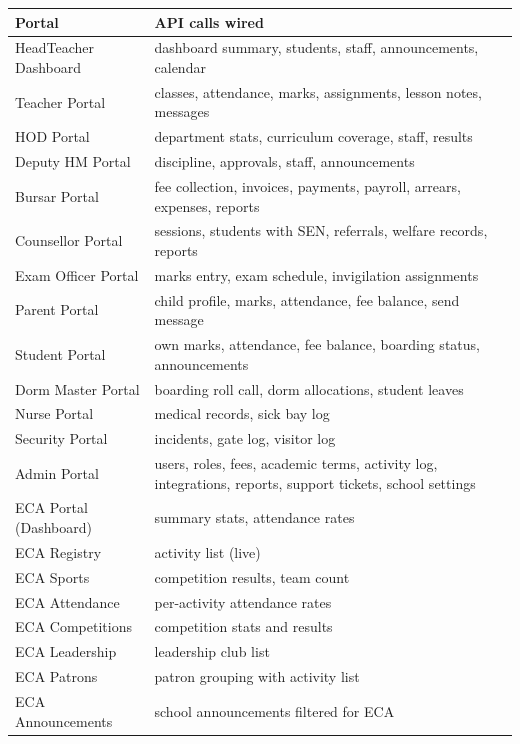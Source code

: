 \documentclass[11pt, a4paper]{article}
\begin{document}
\begin{longtable}{@{}p{5cm} p{9cm}@{}}
  \toprule
  Portal & API calls wired \\
  \midrule
  \endhead
  HeadTeacher Dashboard & dashboard summary, students, staff, announcements, calendar \\
  Teacher Portal & classes, attendance, marks, assignments, lesson notes, messages \\
  HOD Portal & department stats, curriculum coverage, staff, results \\
  Deputy HM Portal & discipline, approvals, staff, announcements \\
  Bursar Portal & fee collection, invoices, payments, payroll, arrears, expenses, reports \\
  Counsellor Portal & sessions, students with SEN, referrals, welfare records, reports \\
  Exam Officer Portal & marks entry, exam schedule, invigilation assignments \\
  Parent Portal & child profile, marks, attendance, fee balance, send message \\
  Student Portal & own marks, attendance, fee balance, boarding status, announcements \\
  Dorm Master Portal & boarding roll call, dorm allocations, student leaves \\
  Nurse Portal & medical records, sick bay log \\
  Security Portal & incidents, gate log, visitor log \\
  Admin Portal & users, roles, fees, academic terms, activity log, integrations,
    reports, support tickets, school settings \\
  ECA Portal (Dashboard) & summary stats, attendance rates \\
  ECA Registry & activity list (live) \\
  ECA Sports & competition results, team count \\
  ECA Attendance & per-activity attendance rates \\
  ECA Competitions & competition stats and results \\
  ECA Leadership & leadership club list \\
  ECA Patrons & patron grouping with activity list \\
  ECA Announcements & school announcements filtered for ECA \\
  \bottomrule
\end{longtable}
\end{document}
